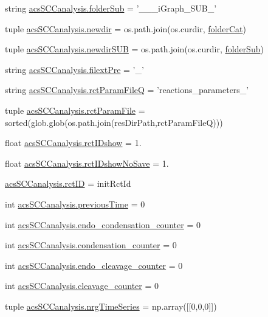 \begin{DoxyCompactItemize}
string \hyperlink{a00130_a90c2bcabbdb271c2c3347ebea4c259bc}{acs\+S\+C\+Canalysis.\+folder\+Sub} = '\+\_\+\+\_\+\_\+i\+Graph\+\_\+\+S\+U\+B\+\_\+'
\item 
tuple \hyperlink{a00130_a440179ca1c764cabcf9181985ae5dfb8}{acs\+S\+C\+Canalysis.\+newdir} = os.\+path.\+join(os.\+curdir, \hyperlink{a00028_ac4793cb55101110d228ded89ce9caa48}{folder\+Cat})
\item 
tuple \hyperlink{a00130_adb3b62d0896774bc87adfee19d047aa8}{acs\+S\+C\+Canalysis.\+newdir\+S\+U\+B} = os.\+path.\+join(os.\+curdir, \hyperlink{a00028_a05c5bf0305e5d58d4dc25bd89a025678}{folder\+Sub})
\item 
string \hyperlink{a00130_a60ff937c050eef601bd84134d1913d8a}{acs\+S\+C\+Canalysis.\+filext\+Pre} = '\+\_\+'
\item 
string \hyperlink{a00130_aff5ea475bb2c78122a231a915dc88e89}{acs\+S\+C\+Canalysis.\+rct\+Param\+File\+Q} = 'reactions\+\_\+parameters\+\_\+'
\item 
tuple \hyperlink{a00130_ac700504fc38d7684ec9fae104d7d90a3}{acs\+S\+C\+Canalysis.\+rct\+Param\+File} = sorted(glob.\+glob(os.\+path.\+join(res\+Dir\+Path,rct\+Param\+File\+Q)))
\item 
float \hyperlink{a00130_a8a780c7762bc8a40f296abfd474b7ce4}{acs\+S\+C\+Canalysis.\+rct\+I\+Dshow} = 1.
\item 
float \hyperlink{a00130_a3942b0b71d5893c244f7f49929db336b}{acs\+S\+C\+Canalysis.\+rct\+I\+Dshow\+No\+Save} = 1.
\item 
\hyperlink{a00130_a78ffc7d3b69c53ec5389a151e7fdcb83}{acs\+S\+C\+Canalysis.\+rct\+I\+D} = init\+Rct\+Id
\item 
int \hyperlink{a00130_aff96a31e98ac46cb47a67b74f5d87351}{acs\+S\+C\+Canalysis.\+previous\+Time} = 0
\item 
int \hyperlink{a00130_a20a51ec68106a5a97fb3a72f417ca4e6}{acs\+S\+C\+Canalysis.\+endo\+\_\+condensation\+\_\+counter} = 0
\item 
int \hyperlink{a00130_a144441bdbe6e835849cf165ea2946848}{acs\+S\+C\+Canalysis.\+condensation\+\_\+counter} = 0
\item 
int \hyperlink{a00130_af5702a39b502da88dde8c38417a0efbd}{acs\+S\+C\+Canalysis.\+endo\+\_\+cleavage\+\_\+counter} = 0
\item 
int \hyperlink{a00130_a0dd6730b063ac11ae4620c4a0778f6d9}{acs\+S\+C\+Canalysis.\+cleavage\+\_\+counter} = 0
\item 
tuple \hyperlink{a00130_ad4d4abc783f2f7f8d1084b1144b4fe2f}{acs\+S\+C\+Canalysis.\+nrg\+Time\+Series} = np.\+array(\mbox{[}\mbox{[}0,0,0\mbox{]}\mbox{]})

\end{DoxyCompactItemize}
